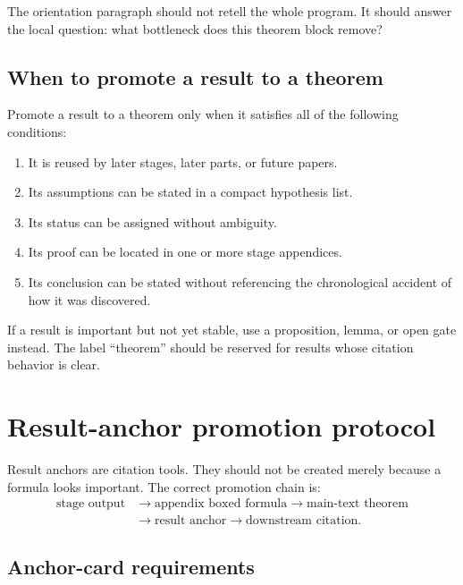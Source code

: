 The orientation paragraph should not retell the whole program.  It should answer the local question: what bottleneck does this theorem block remove?

\subsection{When to promote a result to a theorem}
\label{subsec:when-promote-result-theorem}

Promote a result to a theorem only when it satisfies all of the following conditions:

\begin{enumerate}[leftmargin=2.0em]
\item It is reused by later stages, later parts, or future papers.
\item Its assumptions can be stated in a compact hypothesis list.
\item Its status can be assigned without ambiguity.
\item Its proof can be located in one or more stage appendices.
\item Its conclusion can be stated without referencing the chronological accident of how it was discovered.
\end{enumerate}

If a result is important but not yet stable, use a proposition, lemma, or open gate instead.  The label ``theorem'' should be reserved for results whose citation behavior is clear.

\section{Result-anchor promotion protocol}
\label{sec:result-anchor-promotion-protocol}

Result anchors are citation tools.  They should not be created merely because a formula looks important.  The correct promotion chain is:
\[
\begin{aligned}
\text{stage output}
&\longrightarrow
\text{appendix boxed formula}
\longrightarrow
\text{main-text theorem}
\\
&\longrightarrow
\text{result anchor}
\longrightarrow
\text{downstream citation}.
\end{aligned}
\]

\subsection{Anchor-card requirements}
\label{subsec:anchor-card-requirements}

